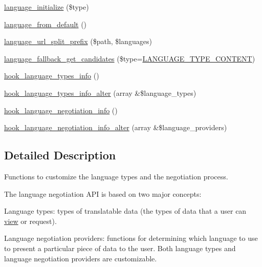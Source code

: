 \begin{DoxyCompactItemize}
\item 
\hyperlink{group__language__negotiation_ga483a318f6485628cbe7bdbf53bf80c5e}{language\_\-initialize} (\$type)
\item 
\hyperlink{group__language__negotiation_ga643666b0e37987d93ab75235bb7729b5}{language\_\-from\_\-default} ()
\item 
\hyperlink{group__language__negotiation_gab8ad64d53e83cae459c25341e564968d}{language\_\-url\_\-split\_\-prefix} (\$path, \$languages)
\item 
\hyperlink{group__language__negotiation_gaaea53d7377445168a1e71bf982d59f11}{language\_\-fallback\_\-get\_\-candidates} (\$type=\hyperlink{bootstrap_8inc_a40466aefcfc6ea9766f1fedf53cb3a6d}{LANGUAGE\_\-TYPE\_\-CONTENT})
\item 
\hyperlink{group__language__negotiation_ga8932d2167557c18966cd033cfbe0f37e}{hook\_\-language\_\-types\_\-info} ()
\item 
\hyperlink{group__language__negotiation_ga9752378ca7c389892fea3fb2960263dd}{hook\_\-language\_\-types\_\-info\_\-alter} (array \&\$language\_\-types)
\item 
\hyperlink{group__language__negotiation_gabcac4b239272ba30c6320a0af2fab46e}{hook\_\-language\_\-negotiation\_\-info} ()
\item 
\hyperlink{group__language__negotiation_gacaed046505a0a8470514731b86910089}{hook\_\-language\_\-negotiation\_\-info\_\-alter} (array \&\$language\_\-providers)
\end{DoxyCompactItemize}


\subsection{Detailed Description}
Functions to customize the language types and the negotiation process.

The language negotiation API is based on two major concepts:
\begin{DoxyItemize}
\item Language types: types of translatable data (the types of data that a user can \hyperlink{classview}{view} or request).
\item Language negotiation providers: functions for determining which language to use to present a particular piece of data to the user. Both language types and language negotiation providers are customizable.
\end{DoxyItemize}

